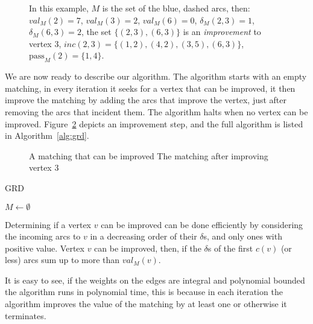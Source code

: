 \begin{figure}
\centering

\caption[]{
\label{fig:defs}
In this example, $M$ is the set of the blue, dashed arcs, then:
$val_M(2) = 7$,
$val_M(3) = 2$,
$val_M(6) = 0$,
$\delta_M(2, 3) = 1$,
$\delta_M(6, 3) = 2$,
the set $\{(2,3), (6,3)\}$ is an \emph{improvement} to vertex 3,
$inc(2,3) = \{(1,2),(4,2),(3,5),(6,3)\}$,
$\text{pass}_M(2) = \{1, 4\}$.
}
\end{figure}

We are now ready to describe our algorithm.
The algorithm starts with an empty matching,
in every iteration it seeks for a vertex that can be improved,
it then improve the matching by adding
the arcs that improve the vertex, 
just after removing the arcs that incident them.
The algorithm halts when no vertex can be improved.
Figure~\ref{fig:improvement} depicts an improvement step,
and the full algorithm is listed in Algorithm~\ref{alg:grd}. 

\begin{figure}
\centering

\caption[]{
\label{fig:improvement}
A matching that can be improved
The matching after improving vertex 3
}
\end{figure}

\begin{algorithm}
\caption{
\label{alg:grd}
GRD
}
$M \leftarrow \emptyset$									\\
\end{algorithm}

\begin{remark}
\label{rem:improve}
Determining if a vertex $v$ can be improved can be done efficiently
by considering the incoming arcs to $v$ in a decreasing order of their $\delta$s,
and only ones with positive value.
Vertex $v$ can be improved, then, if the $\delta$s of the first $c(v)$ (or less) arcs
sum up to more than $val_M(v)$.
\end{remark}

\begin{remark}
It is easy to see, if the weights on the edges are integral and polynomial
bounded the algorithm runs in polynomial time, this is because in each iteration the
algorithm improves the value of the matching by at least one or otherwise it
terminates.
\end{remark}

